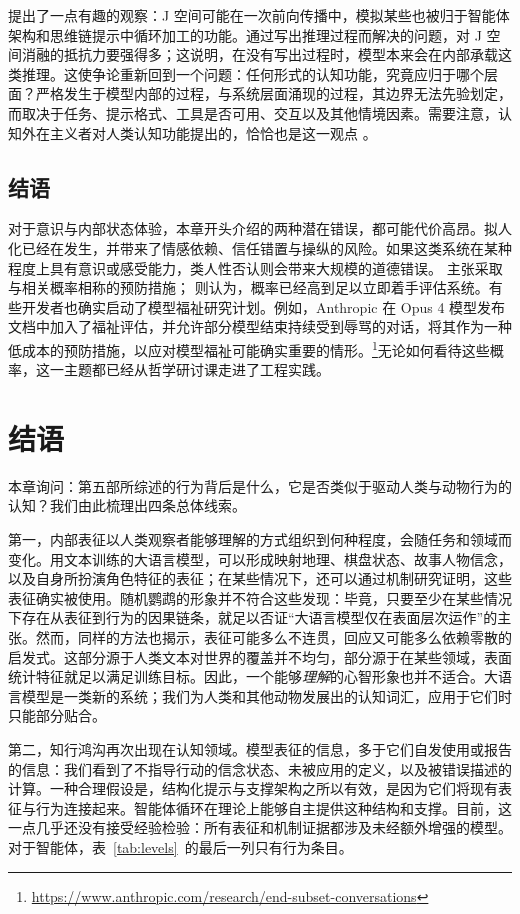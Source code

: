 \citet{gurnee2026verbalize} 提出了一点有趣的观察：J 空间可能在一次前向传播中，模拟某些也被归于智能体架构和思维链提示中循环加工的功能。通过写出推理过程而解决的问题，对 J 空间消融的抵抗力要强得多；这说明，在没有写出过程时，模型本来会在内部承载这类推理。这使争论重新回到一个问题：任何形式的认知功能，究竟应归于哪个层面？严格发生于模型内部的过程，与系统层面涌现的过程，其边界无法先验划定，而取决于任务、提示格式、工具是否可用、交互以及其他情境因素。需要注意，认知外在主义者对人类认知功能提出的，恰恰也是这一观点 \citep{noe2009outofourheads}。

\subsection{结语}
对于意识与内部状态体验，本章开头介绍的两种潜在错误，都可能代价高昂。拟人化已经在发生，并带来了情感依赖、信任错置与操纵的风险。如果这类系统在某种程度上具有意识或感受能力，类人性否认则会带来大规模的道德错误。\citet{birch2024gaming} 主张采取与相关概率相称的预防措施；\citet{butlin2023consciousness} 则认为，概率已经高到足以立即着手评估系统。有些开发者也确实启动了模型福祉研究计划。例如，Anthropic 在 Opus 4 模型发布文档中加入了福祉评估，并允许部分模型结束持续受到辱骂的对话，将其作为一种低成本的预防措施，以应对模型福祉可能确实重要的情形。\footnote{\url{https://www.anthropic.com/research/end-subset-conversations}}无论如何看待这些概率，这一主题都已经从哲学研讨课走进了工程实践。


\section{结语}
本章询问：第五部所综述的行为背后是什么，它是否类似于驱动人类与动物行为的认知？我们由此梳理出四条总体线索。

第一，内部表征以人类观察者能够理解的方式组织到何种程度，会随任务和领域而变化。用文本训练的大语言模型，可以形成映射地理、棋盘状态、故事人物信念，以及自身所扮演角色特征的表征；在某些情况下，还可以通过机制研究证明，这些表征确实被使用。随机鹦鹉的形象并不符合这些发现：毕竟，只要至少在某些情况下存在从表征到行为的因果链条，就足以否证“大语言模型仅在表面层次运作”的主张。然而，同样的方法也揭示，表征可能多么不连贯，回应又可能多么依赖零散的启发式。这部分源于人类文本对世界的覆盖并不均匀，部分源于在某些领域，表面统计特征就足以满足训练目标。因此，一个能够\emph{理解}的心智形象也并不适合。大语言模型是一类新的系统；我们为人类和其他动物发展出的认知词汇，应用于它们时只能部分贴合。

第二，知行鸿沟再次出现在认知领域。模型表征的信息，多于它们自发使用或报告的信息：我们看到了不指导行动的信念状态、未被应用的定义，以及被错误描述的计算。一种合理假设是，结构化提示与支撑架构之所以有效，是因为它们将现有表征与行为连接起来。智能体循环在理论上能够自主提供这种结构和支撑。目前，这一点几乎还没有接受经验检验：所有表征和机制证据都涉及未经额外增强的模型。对于智能体，表~\ref{tab:levels}~的最后一列只有行为条目。


